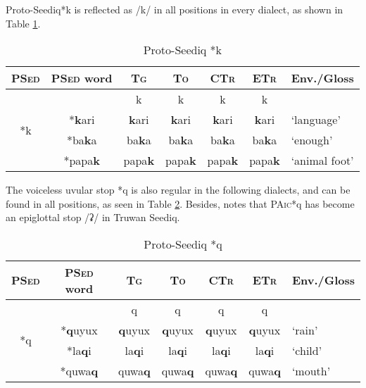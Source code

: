 \documentclass[12pt]{article}
\newcommand{\paic}{\textsc{PAic}\xspace}
\newcommand{\psed}{\textsc{PSed}\xspace}
\newcommand{\psedf}{Proto-Seediq\xspace}
\newcommand{\stg}{\textsc{Tg}\xspace}
\newcommand{\sto}{\textsc{To}\xspace}
\newcommand{\sctr}{\textsc{CTr}\xspace}
\newcommand{\setr}{\textsc{ETr}\xspace}
\begin{document}
\psedf *k is reflected as /k/ in all positions in every dialect, as shown in Table \ref{tab:k}. 

\begin{table}[!htbp]
\centering
\caption{Proto-Seediq *k}
\label{tab:k}
\begin{tabular}{c|c|cccc|l}
\textbf{\psed} & \textbf{\psed word}      & \textbf{\stg} & \textbf{\sto} & \textbf{\sctr} & \textbf{\setr} & \multicolumn{1}{c}{\textbf{Env./Gloss}} \\ \hline
\multirow{4}{*}{*k}  & & k    & k    & k     & k     &                          \\ \cline{2-7}
                    & *\textbf{k}ari & \textbf{k}ari & \textbf{k}ari & \textbf{k}ari & \textbf{k}ari & `language' \\ 
                    & *ba\textbf{k}a & ba\textbf{k}a & ba\textbf{k}a & ba\textbf{k}a & ba\textbf{k}a & `enough' \\
                    & *papa\textbf{k} & papa\textbf{k} & papa\textbf{k} & papa\textbf{k} & papa\textbf{k} & `animal foot' \\ \hline
\end{tabular}%
\end{table}

The voiceless uvular stop *q is also regular in the following dialects, and can be found in all positions, as seen in Table \ref{tab:q}. Besides, \textcite{li1981paic} notes that \paic *q has become an epiglottal stop /ʡ/ in Truwan Seediq. 

\begin{table}[!htbp]
\centering
\caption{Proto-Seediq *q}
\label{tab:q}
\begin{tabular}{c|c|cccc|l}
\textbf{\psed} & \textbf{\psed word}      & \textbf{\stg} & \textbf{\sto} & \textbf{\sctr} & \textbf{\setr} & \multicolumn{1}{c}{\textbf{Env./Gloss}} \\ \hline
\multirow{4}{*}{*q}  & & q    & q    & q     & q     &                          \\ \cline{2-7}
                    & *\textbf{q}uyux & \textbf{q}uyux & \textbf{q}uyux & \textbf{q}uyux & \textbf{q}uyux & `rain' \\
                    & *la\textbf{q}i & la\textbf{q}i & la\textbf{q}i & la\textbf{q}i & la\textbf{q}i & `child' \\
                    & *quwa\textbf{q} & quwa\textbf{q} & quwa\textbf{q} & quwa\textbf{q} & quwa\textbf{q} & `mouth' \\ \hline
\end{tabular}%
\end{table}
\end{document}
